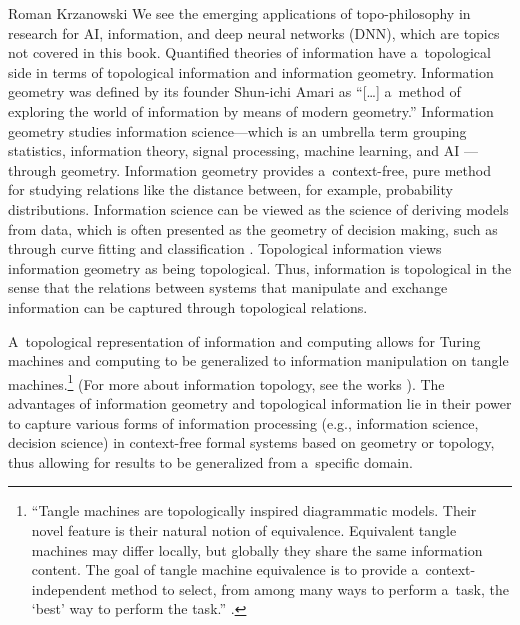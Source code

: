 \begin{newrevengenv}{Roman Krzanowski}
We see the emerging applications of topo-philosophy in research for AI, information, and deep neural networks (DNN), which are topics not covered in this book. Quantified theories of information have a~topological side in terms of topological information and information geometry. Information geometry was defined by its founder Shun-ichi Amari 
\parencite*[][]{amari_information_2016} %
 as ``[…] a~method of exploring the world of information by means of modern geometry.'' Information geometry studies information science---which is an umbrella term grouping statistics, information theory, signal processing, machine learning, and AI 
\parencite[][]{nielsen_elementary_2020}%
---through geometry. Information geometry provides a~context-free, pure method for studying relations like the distance between, for example, probability distributions. Information science can be viewed as the science of deriving models from data, which is often presented as the geometry of decision making, such as through curve fitting and classification 
\parencites[][]{nielsen_elementary_2020}[][]{nielsen_many_2022}. %
 Topological information views information geometry as being topological. Thus, information is topological in the sense that the relations between systems that manipulate and exchange information can be captured through topological relations.



A~topological representation of information and computing allows for Turing machines and computing to be generalized to information manipulation on tangle machines.\footnote{``Tangle machines are topologically inspired diagrammatic models. Their novel feature is their natural notion of equivalence. Equivalent tangle machines may differ locally, but globally they share the same information content. The goal of tangle machine equivalence is to provide a~context-independent method to select, from among many ways to perform a~task, the ‘best' way to perform the task.'' 
\parencite[][p.1]{carmi_tangle_2015}.%
} (For more about information topology, see the works 
\parencites[][]{moskovich_tangle_2014}[][]{carmi_tangle_2015}%
). The advantages of information geometry and topological information lie in their power to capture various forms of information processing (e.g., information science, decision science) in context-free formal systems based on geometry or topology, thus allowing for results to be generalized from a~specific domain.




\end{newrevengenv}
